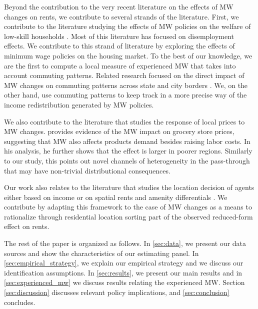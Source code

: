 Beyond the contribution to the very recent literature on the effects of MW changes on 
rents, we contribute to several strands of the literature.
First, we contribute to the literature studying the effects of MW policies on the welfare 
of low-skill households \parencite[][among others]{DinardoEtAl1995, Lee1999, 
CardKrueger2000, Neumark2006, AutorEtAl2016, CegnizEtAl2019}.
Most of this literature has focused on disemployment effects. We contribute to this 
strand of literature by exploring the effects of minimum wage policies on the housing 
market.
To the best of our knowledge, we are the first to compute a local measure of experienced 
MW that takes into account commuting patterns.
Related research focused on the direct impact of MW changes on commuting patterns across 
state and city borders \parencite{Mckinnish2017, PerezPerez2018}.
We, on the other hand, use commuting patterns to keep track in a more precise way of the 
income redistribution generated by MW policies.

We also contribute to the literature that studies the response of local prices to MW 
changes. \textcite{Leung2018} provides evidence of the MW impact on grocery store prices, 
suggesting that MW also affects products demand besides raising labor costs. In his 
analysis, he further shows that the effect is larger in poorer regions. Similarly to our 
study, this points out novel channels of heterogeneity in the pass-through that may have 
non-trivial distributional consequences.

Our work also relates to the literature that studies the location decision of agents 
either based on income \parencite{Roback1982, Kennan2011, DesmetRossihansberg2013, 
PerezPerez2018, Monras2019} or on spatial rents and amenity differentials 
\parencite{Diamond2016, AlmagroDominguez2019, Couture2019}.
We contribute by adapting this framework to the case of MW changes as a means to 
rationalize through residential location sorting part of the observed reduced-form effect 
on rents.

The rest of the paper is organized as follows. In \autoref{sec:data}, we present our data 
sources and show the characteristics of our estimating panel. In 
\autoref{sec:empirical_strategy}, we explain our empirical strategy and we discuss our 
identification assumptions. In \autoref{sec:results}, we present our main results and in 
\ref{sec:experienced_mw} we discuss results relating the experienced MW. Section 
\ref{sec:discussion} discusses relevant policy implications, and \autoref{sec:conclusion} 
concludes.
